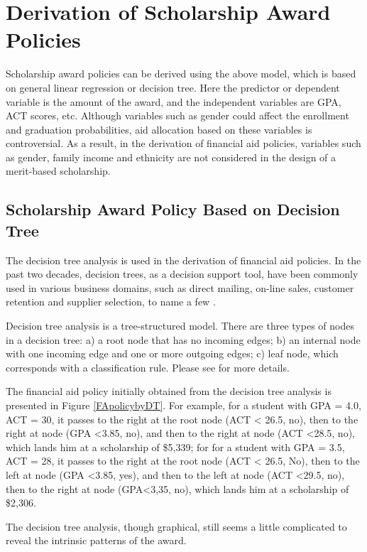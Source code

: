 \documentclass[12pt,english]{report}
\begin{document}
\section{Derivation of Scholarship Award Policies}
Scholarship award policies can be derived using the above model, which is based on general linear regression or decision tree.  Here the predictor or dependent variable is the amount of the award, and the independent variables are GPA, ACT scores, etc.  Although variables such as gender could affect the enrollment and graduation probabilities,  aid allocation based on these variables is controversial. 
As a result, in the derivation of financial aid policies, variables such as gender, family income and ethnicity are not considered in the design of a merit-based scholarship.

\subsection{Scholarship Award Policy Based on Decision Tree }

The decision tree analysis is used in the derivation of  financial aid policies.  In the past two decades, decision trees, as a decision support tool, have been commonly used in various business domains, such as direct mailing, on-line sales, customer retention and supplier selection, to name a few \citep{Han2011}.

Decision tree analysis is a tree-structured model. There are three types of nodes in a decision tree: a) a root node that has no incoming edges; b) an internal node with one incoming edge and one or more outgoing edges; c) leaf node, which corresponds with a classification rule. Please see \citep{Maimon2005} for more details.

The financial aid policy initially obtained from the decision tree analysis is presented in Figure \ref{FApolicybyDT}.  For example, for a student with GPA = 4.0, ACT = 30, it passes to the right at the root node (ACT < 26.5, no),  then to the right at node (GPA <3.85, no), and then to the right at node (ACT <28.5, no),  which lands him at a scholarship of \$5,339;   for  for a student with GPA = 3.5, ACT = 28, it passes to the right at the root node (ACT < 26.5, No), then to the left at node (GPA <3.85, yes), and then to the left at node (ACT <29.5, no), then to the right at node (GPA<3,35, no), which lands him at a scholarship of \$2,306.

The decision tree analysis, though graphical, still seems a little complicated to reveal the intrinsic patterns of the award. 
\end{document}
